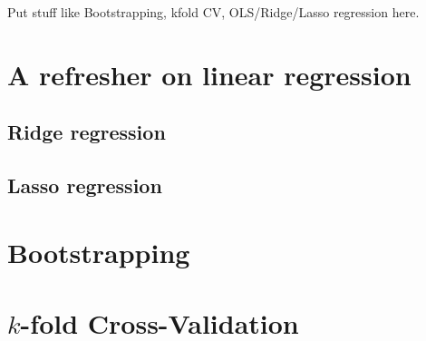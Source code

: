 \begin{appendices}
Put stuff like Bootstrapping, kfold CV, OLS/Ridge/Lasso regression here.

\section{A refresher on linear regression}
\subsection{Ridge regression}
\subsection{Lasso regression}

\section{Bootstrapping}
\section{\texorpdfstring{$k$}{k}-fold Cross-Validation}
\end{appendices}